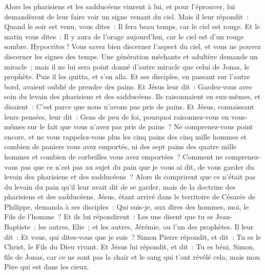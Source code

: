 \begin{multicols}{2}
\VerseOne{}Alors les pharisiens et les sadducéens vinrent à lui, et pour l'éprouver, lui demandèrent de leur faire voir un signe venant du ciel.
Mais il leur répondit~: Quand le soir est venu, vous dites~: Il fera beau temps, car le ciel est rouge.
Et le matin vous dites~: Il y aura de l'orage aujourd'hui, car le ciel est d'un rouge sombre. Hypocrites ! Vous savez bien discerner l'aspect du ciel, et vous ne pouvez discerner les signes des temps.
Une génération méchante et adultère demande un miracle~; mais il ne lui sera point donné d'autre miracle que celui de Jonas, le prophète. Puis il les quitta, et s'en alla.
Et ses disciples, en passant sur l'autre bord, avaient oublié de prendre des pains.
Et Jésus leur dit~: Gardez-vous avec soin du levain des pharisiens et des sadducéens.
Ils raisonnaient en eux-mêmes, et disaient~: C'est parce que nous n'avons pas pris de pains.
Et Jésus, connaissant leurs pensées, leur dit~: Gens de peu de foi, pourquoi raisonnez-vous en vous-mêmes sur le fait que vous n'avez pas pris de pains~?
Ne comprenez-vous point encore, et ne vous rappelez-vous plus les cinq pains des cinq mille hommes et combien de paniers vous avez emportés,
ni des sept pains des quatre mille hommes et combien de corbeilles vous avez emportées~?
Comment ne comprenez-vous pas que ce n'est pas au sujet du pain que je vous ai dit, de vous garder du levain des pharisiens et des sadducéens~?
Alors ils comprirent que ce n'était pas du levain du pain qu'il leur avait dit de se garder, mais de la doctrine des pharisiens et des sadducéens.
Jésus, étant arrivé dans le territoire de Césarée de Philippe, demanda à ses disciples~: Qui suis-je, aux dires des hommes, moi, le Fils de l'homme~?
Et ils lui répondirent~: Les uns disent que tu es Jean-Baptiste~; les autres, Elie~; et les autres, Jérémie, ou l'un des prophètes.
Il leur dit~: Et vous, qui dites-vous que je suis~?
Simon Pierre répondit, et dit~: Tu es le Christ, le Fils du Dieu vivant.
Et Jésus lui répondit, et dit~: Tu es béni, Simon, fils de Jonas, car ce ne sont pas la chair et le sang qui t'ont révélé cela, mais mon Père qui est dans les cieux.

\end{multicols}

